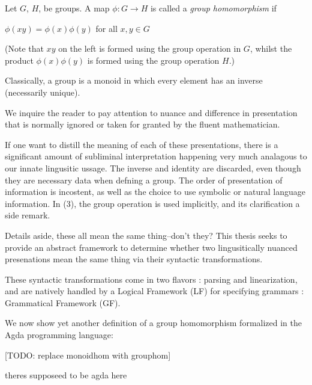 
\begin{definition}
Let $G$, $H$, be groups.  A map $\phi : G \to H$ is called a \emph{group homomorphism} if
\begin{center}
  $\phi(xy) = \phi ( x ) \phi ( y )$ for all $x, y \in G$ 
\end{center}
(Note that $xy$ on the left is formed using the group operation in $G$, whilst the product $\phi ( x ) \phi ( y )$ is formed using the group operation $H$.)
\end{definition}


\begin{definition}
Classically, a group is a monoid in which every element has an inverse (necessarily unique).
\end{definition}

We inquire the reader to pay attention to nuance and difference in presentation
that is normally ignored or taken for granted by the fluent mathematician.

If one want to distill the meaning of each of these presentations, there is a
significant amount of subliminal interpretation happening very much analagous
to our innate lingusitic ussage.  The inverse and identity are discarded, even
though they are necessary data when defning a group. The order of presentation
of information is incostent, as well as the choice to use symbolic or natural
language information. In (3), the group operation is used implicitly, and its
clarification a side remark.

Details aside, these all mean the same thing--don't they?  This thesis seeks to provide an
abstract framework to determine whether two lingusitically nuanced presenations
mean the same thing via their syntactic transformations. 

These syntactic transformations come in two flavors : parsing and
linearization, and are natively handled by a Logical Framework (LF) for
specifying grammars : Grammatical Framework (GF).


We now show yet another definition of a group homomorphism formalized in the
Agda programming language:

[TODO: replace monoidhom with grouphom]

theres supposeed to be agda here



